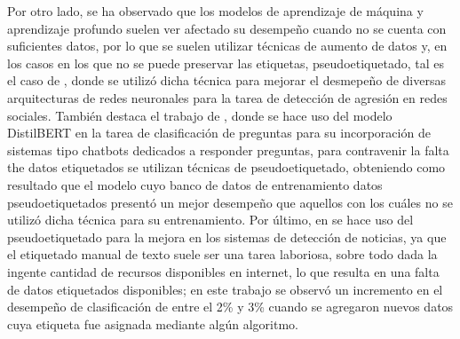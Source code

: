 \documentclass[a4paper]{llncs}
\begin{document}
Por otro lado, se ha observado que los modelos de aprendizaje de máquina y
aprendizaje profundo suelen ver afectado su desempeño cuando no se cuenta con
suficientes datos, por lo que se suelen utilizar técnicas de aumento de datos y,
en los casos en los que no se puede preservar las etiquetas, pseudoetiquetado,
tal es el caso de \cite{gelbukh-2018-aggression}, donde se utilizó dicha técnica
para mejorar el desmepeño de diversas arquitecturas de redes neuronales para la
tarea de detección de agresión en redes sociales. También destaca el trabajo de
\cite{pseudoetiquedato_transformers}, donde se hace uso del modelo DistilBERT en
la tarea de clasificación de preguntas para su incorporación de sistemas tipo
chatbots dedicados a responder preguntas, para contravenir la falta the datos
etiquetados se utilizan técnicas de pseudoetiquetado, obteniendo como resultado
que el modelo cuyo banco de datos de entrenamiento datos pseudoetiquetados
presentó un mejor desempeño que aquellos con los cuáles no se utilizó dicha
técnica para su entrenamiento. Por último, en \cite{blue} se hace uso del
pseudoetiquetado para la mejora en los sistemas de detección de noticias, ya que
el etiquetado manual de texto suele ser una tarea laboriosa, sobre todo dada la
ingente cantidad de recursos disponibles en internet, lo que resulta en una
falta de datos etiquetados disponibles; en este trabajo se observó un incremento
en el desempeño de clasificación de entre el 2\% y 3\% cuando se agregaron nuevos
datos cuya etiqueta fue asignada mediante algún algoritmo.





\end{document}
